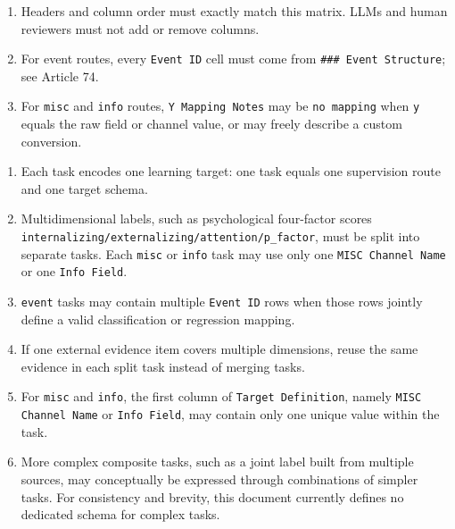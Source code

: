 \begin{tcolorbox}
\begin{enumerate}[leftmargin=1.5em,noitemsep,topsep=2pt]
\item Headers and column order must exactly match this matrix. LLMs and human reviewers must not add or remove columns.
\item For event routes, every \texttt{Event ID} cell must come from \texttt{\#\#\# Event Structure}; see Article 74.
\item For \texttt{misc} and \texttt{info} routes, \texttt{Y Mapping Notes} may be \texttt{no mapping} when \texttt{y} equals the raw field or channel value, or may freely describe a custom conversion.
\end{enumerate}

\smallskip{}\par\smallskip

\begin{enumerate}[leftmargin=1.5em,noitemsep,topsep=2pt]
\item Each task encodes one learning target: one task equals one supervision route and one target schema.
\item Multidimensional labels, such as psychological four-factor scores \texttt{internalizing/externalizing/attention/p\_factor}, must be split into separate tasks. Each \texttt{misc} or \texttt{info} task may use only one \texttt{MISC Channel Name} or one \texttt{Info Field}.
\item \texttt{event} tasks may contain multiple \texttt{Event ID} rows when those rows jointly define a valid classification or regression mapping.
\item If one external evidence item covers multiple dimensions, reuse the same evidence in each split task instead of merging tasks.
\item For \texttt{misc} and \texttt{info}, the first column of \texttt{Target Definition}, namely \texttt{MISC Channel Name} or \texttt{Info Field}, may contain only one unique value within the task.
\item More complex composite tasks, such as a joint label built from multiple sources, may conceptually be expressed through combinations of simpler tasks. For consistency and brevity, this document currently defines no dedicated schema for complex tasks.
\end{enumerate}

\smallskip{}\par\smallskip


\end{tcolorbox}
